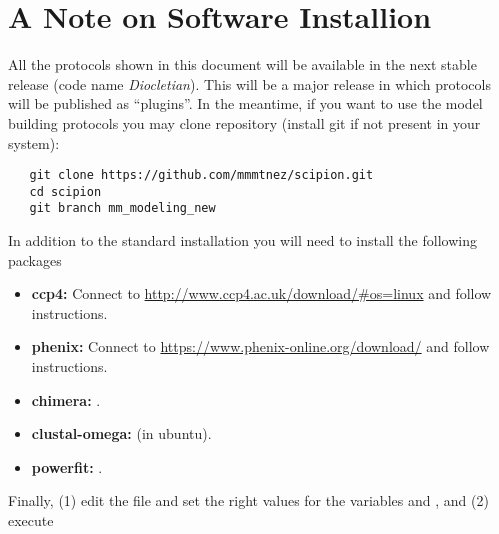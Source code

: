 \section{A Note on Software Installion}
  All the protocols shown in this document will be available in the next stable \scipion release (code name \textit{Diocletian}). This will be a major release in which protocols will be published as ``plugins''. In the meantime, if you want to use the model building protocols you may clone \scipion repository (install git if not present in your system):

  \begin{verbatim}
   git clone https://github.com/mmmtnez/scipion.git
   cd scipion
   git branch mm_modeling_new
  \end{verbatim}

  In addition to the standard \scipion installation you will need to install the following packages
  
  \begin{itemize}
   \item\textbf{ccp4:} Connect to \url{http://www.ccp4.ac.uk/download/#os=linux} and follow instructions.
   \item\textbf{phenix:} Connect to \url{https://www.phenix-online.org/download/} and follow instructions.
   \item\textbf{chimera:} .
   \item\textbf{clustal-omega:}  (in ubuntu).
   \item\textbf{powerfit:} .
  \end{itemize}

  
  Finally, (1) edit the file  and set the right values for the variables  and , and (2) execute 
